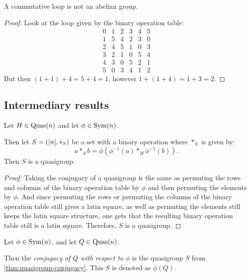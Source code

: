 \begin{counterexample} \label{counterexample:commutative-loop-abelian}
    A commutative loop is not an abelian group.
\end{counterexample}
\begin{proof}
    Look at the loop given by the binary operation table:
    \[
        \begin{matrix}
            0 & 1 & 2 & 3 & 4 & 5 \\
            1 & 5 & 4 & 2 & 3 & 0 \\
            2 & 4 & 5 & 1 & 0 & 3 \\
            3 & 2 & 1 & 0 & 5 & 4 \\
            4 & 3 & 0 & 5 & 2 & 1 \\
            5 & 0 & 3 & 4 & 1 & 2
        \end{matrix}
    \]
    But then \( (1 + 1) + 4 = 5 + 4 = 1 \), however \( 1 + (1 + 4) = 1 + 3 = 2 \).
\end{proof}

\subsection{Intermediary results}

\begin{theorem} \label{thm:quasigroup-conjugacy}
    Let \( H \in \operatorname{Quas}(n) \) and let \( \phi \in \operatorname{Sym}(n) \).

    Then let \( S = \left( [n], *_S \right) \) be a set with a binary operation where \( *_S \) is given by:
    \[
        a *_S b = \phi(\phi^{-1}(a) *_H \phi^{-1}(b)).
    \]
    Then \( S \) is a quasigroup.
\end{theorem}
\begin{proof}
    Taking the conjugacy of a quasigroup is the same as permuting the rows and columns of the binary operation table by \( \phi \) and then permuting the elements by \( \phi \). And since permuting the rows or permuting the columns of the binary operation table still gives a latin square, as well as permuting the elements still keeps the latin square structure, one gets that the resulting binary operation table still is a latin square. Therefore, \( S \) is a quasigroup.
\end{proof}

\begin{definition} \label{def:quasigroup-conjugacy}
    Let \( \phi \in \operatorname{Sym}(n) \), and let \( Q \in \operatorname{Quas}(n) \).

    Then the \emph{conjugacy of \( Q \) with respect to \( \phi \)} is the quasigroup \( S \) from \autoref{thm:quasigroup-conjugacy}. This \( S \) is denoted as \( \phi(Q) \).
\end{definition}

